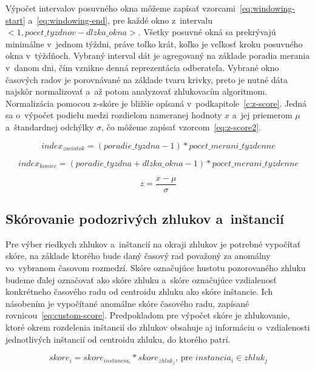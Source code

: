 \documentclass[a4paper,twoside,slovak,12pt,appendix]{article}
\begin{document}
Výpočet intervalov posuvného okna môžeme zapísať
vzorcami~\ref{eq:windowing-start} a~\ref{eq:windowing-end}, pre každé okno
z~intervalu $<1, pocet\_tyzdnov - dlzka\_okna>$. Všetky posuvné okná sa
prekrývajú minimálne v~jednom týždni, práve toľko krát, koľko je veľkosť kroku
posuvného okna v~týždňoch. Vybraný interval dát je agregovaný na základe
poradia merania v~danom dni, čím vznikne denná reprezentácia odberateľa. Vybrané
okno časových radov je porovnávané na základe tvaru krivky, preto je nutné dáta
najskôr normalizovať a~až potom analyzovať zhlukovacím algoritmom. Normalizácia
pomocou z-skóre  je bližšie opísaná v~podkapitole~\ref{c:z-score}. Jedná sa
o~výpočet podielu medzi rozdielom nameranej hodnoty $x$ a~jej priemerom $\mu$
a~štandardnej odchýlky $\sigma$, čo môžeme zapísať vzorcom~\ref{eq:z-score2}.

\begin{equation}
  index_{zaciatok} = (poradie\_tyzdna - 1) * pocet\_merani\_tyzdenne
  \label{eq:windowing-start}
\end{equation}

\begin{equation}
  index_{koniec} = (poradie\_tyzdna + dlzka\_okna - 1) * pocet\_merani\_tyzdenne
  \label{eq:windowing-end}
\end{equation}

\begin{equation}
	\label{eq:z-score2}
  z = \frac{x-\mu}{\sigma}
\end{equation}

\subsection{Skórovanie podozrivých zhlukov a~inštancií}
Pre výber riedkych zhlukov a~inštancií na okraji zhlukov je potrebné vypočítať
skóre, na základe ktorého bude daný časový rad považoný za anomálny vo~vybranom
časovom rozmedzí. Skóre označujúce hustotu pozorovaného zhluku budeme ďalej
označovať ako skóre zhluku a~skóre označujúce vzdialenosť konkrétneho časového
radu od centroidu zhluku ako skóre inštancie. Ich násobením je vypočítané
anomálne skóre časového radu, zapísané rovnicou~\ref{eq:custom-score}.
Predpokladom pre výpočet skóre je zhlukovanie, ktoré okrem rozdelenia inštancií
do zhlukov obsahuje aj informáciu o~vzdialenosti jednotlivých inštancií od
centroidu zhluku, do ktorého patrí.

\begin{equation}
  skore_i = skore_{instancia_i} * skore_{zhluk_j} \text{, pre } instancia_i \in zhluk_j
  \label{eq:custom-score}
\end{equation}
\end{document}
